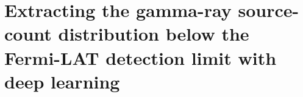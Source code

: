 
\section{Extracting the gamma-ray source-count distribution below the Fermi-LAT detection limit with deep learning}
\label{sec:dnds_paper}








\begin{subappendices}
	
\end{subappendices}
